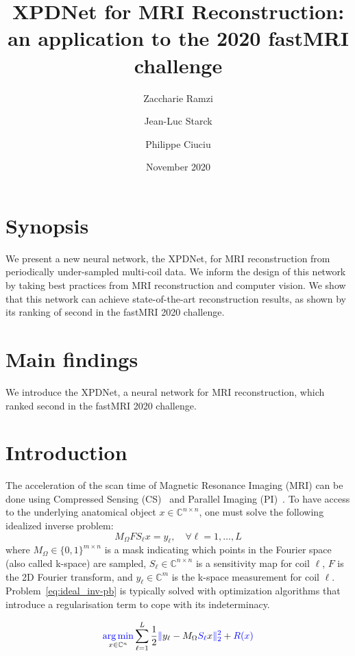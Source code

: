 \documentclass{article}
\title{XPDNet for MRI Reconstruction: an application to the 2020 fastMRI challenge}
\author[1]{Zaccharie Ramzi}
\author[2]{Jean-Luc Starck}
\author[3]{Philippe Ciuciu}
\affil[1]{CEA (Neurospin \& Cosmostat), Inria (Parietal)}
\affil[2]{AIM, CEA, CNRS, Université Paris-Saclay, Université Paris Diderot, Sorbonne Paris Cité}
\affil[3]{Neurospin, Inria (Parietal)}
\date{November 2020}
\begin{document}
\maketitle

\section{Synopsis}
We present a new neural network, the XPDNet, for MRI reconstruction from periodically under-sampled multi-coil data. 
We inform the design of this network by taking best practices from MRI reconstruction and computer vision.
We show that this network can achieve state-of-the-art reconstruction results, as shown by its ranking of second in the fastMRI 2020 challenge.

\section{Main findings}
We introduce the XPDNet, a neural network for MRI reconstruction, which ranked second in the fastMRI 2020 challenge.



\section{Introduction}

The acceleration of the scan time of Magnetic Resonance Imaging (MRI) can be done using Compressed Sensing (CS)~\cite{Lustig2007} and Parallel Imaging (PI)~\cite{Griswold2002GeneralizedGRAPPA, Pruessmann1999SENSE:MRI}.
To have access to the underlying anatomical object $x\in\mathbb{C}^{n \times n}$, one must solve the following idealized inverse problem:
\begin{equation}
    \label{eq:ideal_inv-pb}
    M_{\Omega} F S_\ell x = y_\ell, \quad \forall \ell=1,\ldots, L
\end{equation}
where $M_{\Omega}\in\{0,1\}^{m\times n} $ is a mask indicating which points in the Fourier space (also called k-space) are sampled, $S_\ell\in\mathbb{C}^{n\times n}$ is a sensitivity map for coil $\ell$, $F$ is the 2D Fourier transform, and $y_\ell\in\mathbb{C}^m$ is the k-space measurement for coil $\ell$. Problem~\eqref{eq:ideal_inv-pb} is typically solved with optimization algorithms that introduce a regularisation term to cope with its indeterminacy.

\begin{equation}
    \underset{x \in \mathbb{C}^{n}}{\textcolor{blue}{\operatorname{arg\,min}}} \sum_{\ell=1}^L \frac{1}{2} \textcolor{blue}{\|}y_\ell-M_{\Omega} \textcolor{blue}{S_\ell} x\textcolor{blue}{\|_{2}^{2}}+\textcolor{blue}{R(x)}
    \label{eq:opt-prob}
\end{equation}
\end{document}

